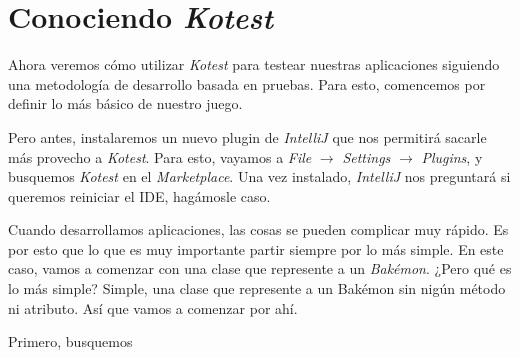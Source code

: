 \section{Conociendo \textit{Kotest}}
\label{sec:conociendo-kotest}

  Ahora veremos cómo utilizar \textit{Kotest} para testear nuestras aplicaciones siguiendo una
  metodología de desarrollo basada en pruebas.
  Para esto, comencemos por definir lo más básico de nuestro juego.

  Pero antes, instalaremos un nuevo plugin de \textit{IntelliJ} que nos permitirá sacarle más 
  provecho a \textit{Kotest}.
  Para esto, vayamos a \textit{File} $\rightarrow$ \textit{Settings} $\rightarrow$ \textit{Plugins},
  y busquemos \textit{Kotest} en el \textit{Marketplace}.
  Una vez instalado, \textit{IntelliJ} nos preguntará si queremos reiniciar el IDE, hagámosle caso.

  Cuando desarrollamos aplicaciones, las cosas se pueden complicar muy rápido.
  Es por esto que lo que es muy importante partir siempre por lo más simple.
  En este caso, vamos a comenzar con una clase que represente a un \textit{Bakémon}.
  ¿Pero qué es lo más simple?
  Simple, una clase que represente a un Bakémon sin nigún método ni atributo.
  Así que vamos a comenzar por ahí.

  Primero, busquemos 